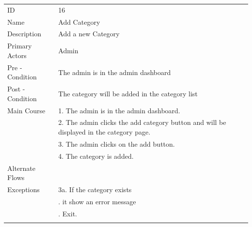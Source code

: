 \documentclass{report}
\begin{document}
\begin{tabular}{ l l }
ID 					& 16 \\
Name 				& Add Category \\
Description 			& Add a new Category \\ 
Primary Actors 		& Admin \\
Pre - Condition 		& The admin is in the admin dashboard \\ 
Post - Condition 	& The category will be added in the category list \\ 
Main Course			& 1. The admin is in the admin dashboard. \\
					& 2. The admin clicks the add category button and will be displayed in the category page. \\
					& 3. The admin clicks on the add button. \\
    					& 4. The category is added. \\
Alternate Flows		& \\
Exceptions 			& 3a. If the category exists \\
					& \qquad 1. it show an error message \\ 
					& \qquad 2. Exit.\\ \\
\end{tabular}
\end{document}
